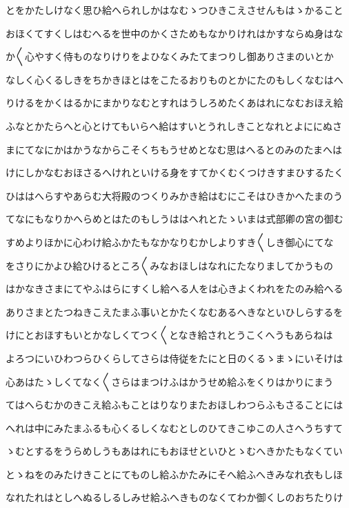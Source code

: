 \documentclass[a4paper,11pt,landscape]{ltjtarticle}
\begin{document}
とをかたしけなく思ひ給へられしかはなむゝつひきこえさせんもはゝかること
\par\medskip
おほくてすくしはむへるを世中のかくさためもなかりけれはかすならぬ身はな
\par\medskip
か〱心やすく侍ものなりけりをよひなくみたてまつりし御ありさまのいとか
\par\medskip
なしく心くるしきをちかきほとはをこたるおりものとかにたのもしくなむはへ
\par\medskip
りけるをかくはるかにまかりなむとすれはうしろめたくあはれになむおほえ給
\par\medskip
ふなとかたらへと心とけてもいらへ給はすいとうれしきことなれとよににぬさ
\par\medskip
まにてなにかはかうなからこそくちもうせめとなむ思はへるとのみのたまへは
\par\medskip
けにしかなむおほさるへけれといける身をすてかくむくつけきすまひするたく
\par\medskip
ひははへらすやあらむ大将殿のつくりみかき給はむにこそはひきかへたまのう
\par\medskip
てなにもなりかへらめとはたのもしうははへれとたゝいまは式部卿の宮の御む
\par\medskip
すめよりほかに心わけ給ふかたもなかなりむかしよりすき〱しき御心にてな
\par\medskip
をさりにかよひ給ひけるところ〱みなおほしはなれにたなりましてかうもの
\par\medskip
はかなきさまにてやふはらにすくし給へる人をは心きよくわれをたのみ給へる
\par\medskip
ありさまとたつねきこえたまふ事いとかたくなむあるへきなといひしらするを
\par\medskip
けにとおほすもいとかなしくてつく〱となき給されとうこくへうもあらねは
\par\medskip
よろつにいひわつらひくらしてさらは侍従をたにと日のくるゝまゝにいそけは
\par\medskip
心あはたゝしくてなく〱さらはまつけふはかうせめ給ふをくりはかりにまう
\par\medskip
てはへらむかのきこえ給ふもことはりなりまたおほしわつらふもさることには
\par\medskip
へれは中にみたまふるも心くるしくなむとしのひてきこゆこの人さへうちすて
\par\medskip
ゝむとするをうらめしうもあはれにもおほせといひとゝむへきかたもなくてい
\par\medskip
とゝねをのみたけきことにてものし給ふかたみにそへ給ふへきみなれ衣もしほ
\par\medskip
なれたれはとしへぬるしるしみせ給ふへきものなくてわか御くしのおちたりけ
\end{document}
